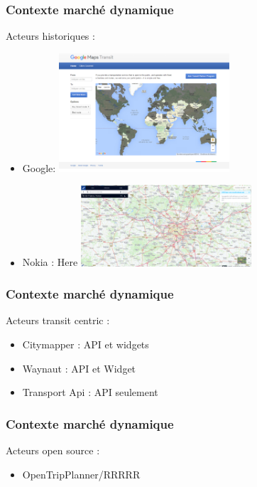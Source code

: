 \documentclass[table]{beamer}
\begin{document}
\begin{frame}
  \frametitle{Contexte marché dynamique}
  \begin{description}
    \item[Acteurs historiques : ]
  \end{description}
  \begin{itemize}
    \item Google: 
    \centering\includegraphics[width=0.5\textwidth]{images/google_transit}
    \item Nokia : Here 
    \centering\includegraphics[width=0.5\textwidth]{images/nokia_here}
  \end{itemize}
\end{frame}

\begin{frame}
  \frametitle{Contexte marché dynamique}
  \begin{description}
    \item[Acteurs transit centric : ]
  \end{description}
  \begin{itemize}
    \item Citymapper : API et widgets 
    \item Waynaut  :  API et Widget
    \item Transport Api : API seulement
  \end{itemize}
\end{frame}

\begin{frame}
  \frametitle{Contexte marché dynamique}
  \begin{description}
    \item[Acteurs open source : ]
  \end{description}
  \begin{itemize}
    \item OpenTripPlanner/RRRRR
  \end{itemize}
\end{frame}
\end{document}
